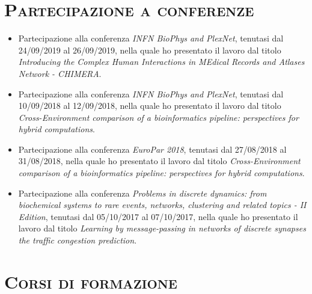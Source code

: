 \documentclass[a4paper,11pt]{article}
\newcommand{\itemicon}[2]{\item[{\texttt{[image: \#2]}}]}
\begin{document}
\vspace*{0.5cm}
\section*{\scshape{Partecipazione a conferenze}}

\begin{itemize}

  \itemicon{0.03}{conference.png} Partecipazione alla conferenza \emph{INFN BioPhys and PlexNet}, tenutasi dal 24/09/2019 al 26/09/2019, nella quale ho presentato il lavoro dal titolo \emph{Introducing the Complex Human Interactions in MEdical Records and Atlases Network - CHIMERA}.

  \itemicon{0.03}{conference.png} Partecipazione alla conferenza \emph{INFN BioPhys and PlexNet}, tenutasi dal 10/09/2018 al 12/09/2018, nella quale ho presentato il lavoro dal titolo \emph{Cross-Environment comparison of a bioinformatics pipeline: perspectives for hybrid computations}.

  \itemicon{0.03}{conference.png} Partecipazione alla conferenza \emph{EuroPar 2018}, tenutasi dal 27/08/2018 al 31/08/2018, nella quale ho presentato il lavoro dal titolo \emph{Cross-Environment comparison of a bioinformatics pipeline: perspectives for hybrid computations}.

  \itemicon{0.03}{conference.png} Partecipazione alla conferenza \emph{Problems in discrete dynamics: from biochemical systems to rare events, networks, clustering and related topics - II Edition}, tenutasi dal 05/10/2017 al 07/10/2017, nella quale ho presentato il lavoro dal titolo \emph{Learning by message-passing in networks of discrete synapses the traffic congestion prediction}.


\end{itemize}


\vspace*{0.5cm}
\section*{\scshape{Corsi di formazione}}
\end{document}
